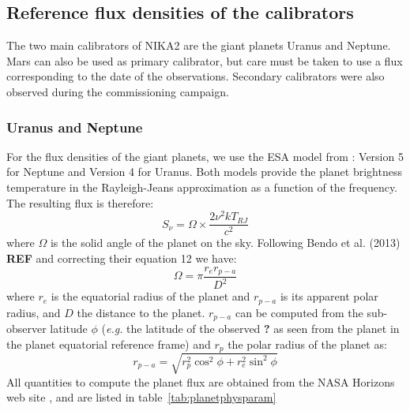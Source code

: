 %
%


\subsection{Reference flux densities of the calibrators}
\label{se:ref_flux}

The two main calibrators of NIKA2 are the giant planets Uranus and
Neptune. Mars can also be used as primary calibrator, but care must be
taken to use a flux corresponding to the date of the
observations. Secondary calibrators were also observed during the
commissioning campaign. 

\subsubsection{Uranus and Neptune}
For the flux densities of the giant planets, we use the ESA model from
\cite{ESAmodel}: Version 5 for Neptune and Version 4 for Uranus. 
Both models provide the planet brightness temperature in the
Rayleigh-Jeans approximation as a function of the frequency. The
resulting flux is therefore: 
\begin{equation}
S_{\nu} = \Omega \times \frac{2 \nu^{2} k T_{RJ}}{c^2}
\end{equation}
where $\Omega$ is the solid angle of the planet on the sky. Following
Bendo et al. (2013) {\bf REF} and correcting their equation 12 we have:
\begin{equation}
\Omega = \pi \frac{r_{e} r_{p-a}}{D^{2}} 
\label{eq:omega}
\end{equation}
where $r_{e}$ is the equatorial radius of the planet and $r_{p-a}$ is
its apparent polar radius, and $D$ the distance to the
planet. $r_{p-a}$ can be computed from the sub-observer latitude $\phi$
({\it e.g.} the latitude of the observed {\bf ?}  as seen from the planet in the
planet equatorial reference frame) and $r_{p}$ the polar radius of the
planet as:
\begin{equation}
r_{p-a} = \sqrt{r_{p}^2 \cos^{2}\phi + r_{e}^2 \sin^{2} \phi}
\end{equation}
All quantities to compute the planet flux are obtained from the NASA
Horizons web site \cite{NASAHorizon}, and are
listed in table~\ref{tab:planetphysparam}

